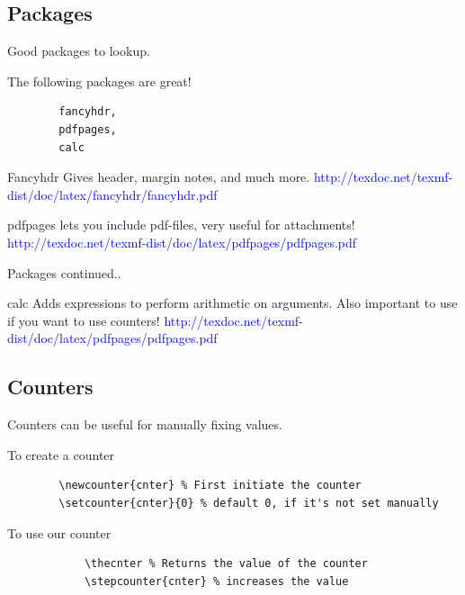 \subsection{Packages}
\begin{frame}[fragile]{Good packages to lookup.}
	\begin{block}{The following packages are great!}
	\begin{lstlisting}
		fancyhdr,
		pdfpages,
		calc
	\end{lstlisting}
	\end{block}
	\begin{block}{Fancyhdr}
	Gives header, margin notes, and much more.
	\textcolor{blue}{http://texdoc.net/texmf-dist/doc/latex/fancyhdr/fancyhdr.pdf}
	\end{block}
	\begin{block}{pdfpages}
	lets you include pdf-files, very useful for attachments!
	\textcolor{blue}{http://texdoc.net/texmf-dist/doc/latex/pdfpages/pdfpages.pdf}
	\end{block}	

\end{frame}
\begin{frame}[fragile]{Packages continued..}
	\begin{block}{calc}
	Adds expressions to perform arithmetic on arguments.
		Also important to use if you want to use counters!
	\textcolor{blue}{http://texdoc.net/texmf-dist/doc/latex/pdfpages/pdfpages.pdf}
	\end{block}
\end{frame}

\subsection{Counters}
\begin{frame}[fragile]{Counters can be useful for manually fixing values.}
	\begin{block}{To create a counter}
	   	\begin{lstlisting}
		\newcounter{cnter} % First initiate the counter
		\setcounter{cnter}{0} % default 0, if it's not set manually
		\end{lstlisting}
   \end{block}
   	\begin{block}{To use our counter}
	   	\begin{lstlisting}
			\thecnter % Returns the value of the counter
			\stepcounter{cnter} % increases the value
		\end{lstlisting}
   \end{block}
\end{frame}